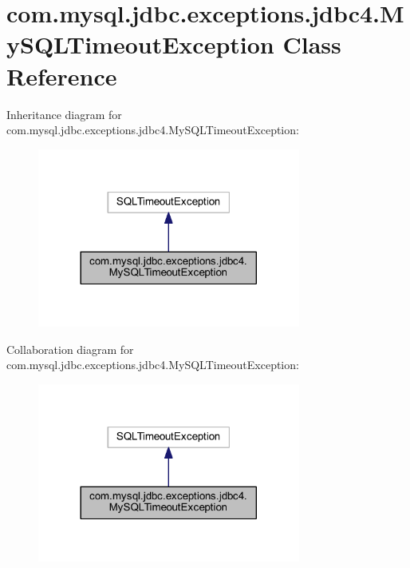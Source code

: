 \hypertarget{classcom_1_1mysql_1_1jdbc_1_1exceptions_1_1jdbc4_1_1_my_s_q_l_timeout_exception}{}\section{com.\+mysql.\+jdbc.\+exceptions.\+jdbc4.\+My\+S\+Q\+L\+Timeout\+Exception Class Reference}
\label{classcom_1_1mysql_1_1jdbc_1_1exceptions_1_1jdbc4_1_1_my_s_q_l_timeout_exception}


Inheritance diagram for com.\+mysql.\+jdbc.\+exceptions.\+jdbc4.\+My\+S\+Q\+L\+Timeout\+Exception\+:
\nopagebreak
\begin{figure}[H]
\begin{center}
\leavevmode
\includegraphics[width=245pt]{classcom_1_1mysql_1_1jdbc_1_1exceptions_1_1jdbc4_1_1_my_s_q_l_timeout_exception__inherit__graph}
\end{center}
\end{figure}


Collaboration diagram for com.\+mysql.\+jdbc.\+exceptions.\+jdbc4.\+My\+S\+Q\+L\+Timeout\+Exception\+:
\nopagebreak
\begin{figure}[H]
\begin{center}
\leavevmode
\includegraphics[width=245pt]{classcom_1_1mysql_1_1jdbc_1_1exceptions_1_1jdbc4_1_1_my_s_q_l_timeout_exception__coll__graph}
\end{center}
\end{figure}

